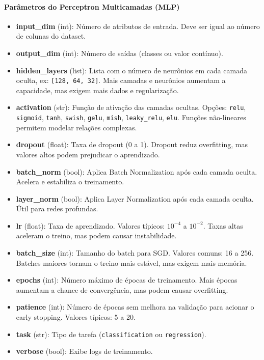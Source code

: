 \documentclass[11pt]{article}
\begin{document}
\paragraph{Parâmetros do Perceptron Multicamadas (MLP)}
\begin{itemize}
    \item \textbf{input\_dim} (int): Número de atributos de entrada. Deve ser igual ao número de colunas do dataset.
    \item \textbf{output\_dim} (int): Número de saídas (classes ou valor contínuo).
    \item \textbf{hidden\_layers} (list): Lista com o número de neurônios em cada camada oculta, ex: \texttt{[128, 64, 32]}. Mais camadas e neurônios aumentam a capacidade, mas exigem mais dados e regularização.
    \item \textbf{activation} (str): Função de ativação das camadas ocultas. Opções: \texttt{relu}, \texttt{sigmoid}, \texttt{tanh}, \texttt{swish}, \texttt{gelu}, \texttt{mish}, \texttt{leaky\_relu}, \texttt{elu}. Funções não-lineares permitem modelar relações complexas.
    \item \textbf{dropout} (float): Taxa de dropout (0 a 1). Dropout reduz overfitting, mas valores altos podem prejudicar o aprendizado.
    \item \textbf{batch\_norm} (bool): Aplica Batch Normalization após cada camada oculta. Acelera e estabiliza o treinamento.
    \item \textbf{layer\_norm} (bool): Aplica Layer Normalization após cada camada oculta. Útil para redes profundas.
    \item \textbf{lr} (float): Taxa de aprendizado. Valores típicos: $10^{-4}$ a $10^{-2}$. Taxas altas aceleram o treino, mas podem causar instabilidade.
    \item \textbf{batch\_size} (int): Tamanho do batch para SGD. Valores comuns: 16 a 256. Batches maiores tornam o treino mais estável, mas exigem mais memória.
    \item \textbf{epochs} (int): Número máximo de épocas de treinamento. Mais épocas aumentam a chance de convergência, mas podem causar overfitting.
    \item \textbf{patience} (int): Número de épocas sem melhora na validação para acionar o early stopping. Valores típicos: 5 a 20.
    \item \textbf{task} (str): Tipo de tarefa (\texttt{classification} ou \texttt{regression}).
    \item \textbf{verbose} (bool): Exibe logs de treinamento.
\end{itemize}
\end{document}
